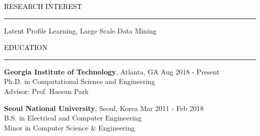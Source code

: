 \documentclass{resume} %
\renewenvironment{rSection}[1]{
	\sectionskip
	\textcolor{Black}{\MakeUppercase{#1}}
	\sectionlineskip
	\hrule
	\begin{list}{}{
			\setlength{\leftmargin}{1.5em}
		}
		\item[]
	}{
	\end{list}
}
\begin{document}
	
	
	\begin{rSection}{Research Interest}
		Latent Profile Learning,
		Large Scale Data Mining\hfill
	\end{rSection}
	
	
	\begin{rSection}{Education}
		{\bf Georgia Institute of Technology}, Atlanta, GA \hfill { Aug 2018 - Present} 
		\\ Ph.D. in Computational Science and Engineering  
		\\ Advisor: Prof. Haesun Park\hfill
		
		{\bf Seoul National University}, Seoul, Korea \hfill { Mar 2011 - Feb 2018} 
		\\ B.S. in Electrical and Computer Engineering \hfill
		\\ Minor in Computer Science \& Engineering \hfill
				
	\end{rSection}

\end{document}
